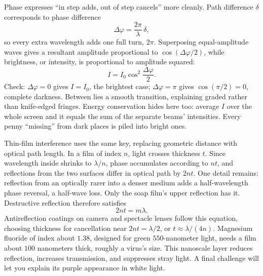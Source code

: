 \begin{mathbridge}
Phase expresses ``in step adds, out of step cancels'' more cleanly. Path difference \(\delta\) corresponds to phase difference
\[
  \Delta\varphi = \frac{2\pi}{\lambda}\,\delta ,
\]
so every extra wavelength adds one full turn, \(2\pi\). Superposing equal-amplitude waves gives a resultant amplitude proportional to \(\cos(\Delta\varphi/2)\), while brightness, or intensity, is proportional to amplitude squared:
\[
  I = I_0\cos^2\!\frac{\Delta\varphi}{2}.
\]
Check: \(\Delta\varphi=0\) gives \(I=I_0\), the brightest case; \(\Delta\varphi=\pi\) gives \(\cos(\pi/2)=0\), complete darkness. Between lies a smooth transition, explaining graded rather than knife-edged fringes. Energy conservation hides here too: average \(I\) over the whole screen and it equals the sum of the separate beams' intensities. Every penny ``missing'' from dark places is piled into bright ones.

Thin-film interference uses the same key, replacing geometric distance with optical path length. In a film of index \(n\), light crosses thickness \(t\). Since wavelength inside shrinks to \(\lambda/n\), phase accumulates according to \(nt\), and reflections from the two surfaces differ in optical path by \(2nt\). One detail remains: reflection from an optically rarer into a denser medium adds a half-wavelength phase reversal, a half-wave loss. Only the soap film's upper reflection has it. Destructive reflection therefore satisfies
\[
  2nt = m\lambda .
\]
Antireflection coatings on camera and spectacle lenses follow this equation, choosing thickness for cancellation near \(2nt=\lambda/2\), or \(t\approx \lambda/(4n)\). Magnesium fluoride of index about \(1.38\), designed for green \(550\)-nanometer light, needs a film about \(100\) nanometers thick, roughly a virus's size. This nanoscale layer reduces reflection, increases transmission, and suppresses stray light. A final challenge will let you explain its purple appearance in white light.
\end{mathbridge}

